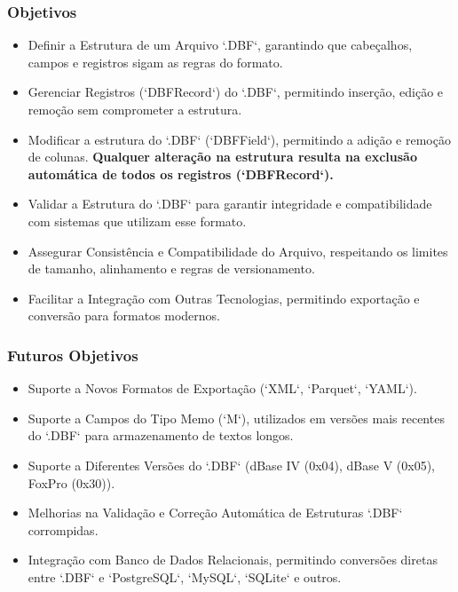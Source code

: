 \begin{titlepage}
    \subsubsection{Objetivos}
    \begin{itemize}
        \item Definir a Estrutura de um Arquivo `.DBF`, garantindo que cabeçalhos, campos e
              registros sigam as regras do formato.
        \item Gerenciar Registros (`DBFRecord`) do `.DBF`, permitindo inserção, edição e
              remoção sem comprometer a estrutura.
        \item Modificar a estrutura do `.DBF` (`DBFField`), permitindo a adição e remoção de
              colunas. \textbf{Qualquer alteração na estrutura resulta na exclusão automática de
              todos os registros (`DBFRecord`).}
        \item Validar a Estrutura do `.DBF` para garantir integridade e compatibilidade com
              sistemas que utilizam esse formato.
        \item Assegurar Consistência e Compatibilidade do Arquivo, respeitando os limites de
              tamanho, alinhamento e regras de versionamento.
        \item Facilitar a Integração com Outras Tecnologias, permitindo exportação e
              conversão para formatos modernos.
    \end{itemize}

    \subsubsection{Futuros Objetivos}
    \begin{itemize}
        \item Suporte a Novos Formatos de Exportação (`XML`, `Parquet`, `YAML`).
        \item Suporte a Campos do Tipo Memo (`M`), utilizados em versões mais recentes do
              `.DBF` para armazenamento de textos longos.
        \item Suporte a Diferentes Versões do `.DBF` (dBase IV (0x04), dBase V (0x05), FoxPro
              (0x30)).
        \item Melhorias na Validação e Correção Automática de Estruturas `.DBF` corrompidas.
        \item Integração com Banco de Dados Relacionais, permitindo conversões diretas entre
              `.DBF` e `PostgreSQL`, `MySQL`, `SQLite` e outros.
    \end{itemize}

    
\end{titlepage}

